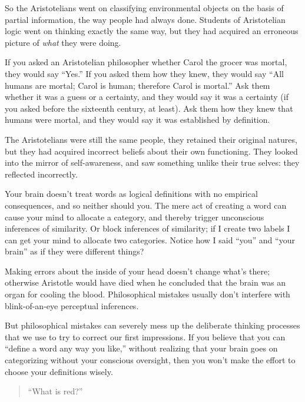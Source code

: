 { So the Aristotelians went on classifying environmental objects on
the basis of partial information, the way people had always done.
Students of Aristotelian logic went on thinking exactly the same way,
but they had acquired an erroneous picture of \textit{what} they were
doing.


 If you asked an Aristotelian philosopher whether Carol the grocer
was mortal, they would say ``Yes.''
If you asked them how they knew, they would say ``All
humans are mortal; Carol is human; therefore Carol is
mortal.'' Ask them whether it was a guess or a
certainty, and they would say it was a certainty (if you asked before
the sixteenth century, at least). Ask them how they knew that humans
were mortal, and they would say it was established by definition.


 The Aristotelians were still the same people, they retained their
original natures, but they had acquired incorrect beliefs about their
own functioning. They looked into the mirror of self-awareness, and saw
something unlike their true selves: they reflected incorrectly.


 Your brain doesn't treat words as logical
definitions with no empirical consequences, and so neither should you.
The mere act of creating a word can cause your mind to allocate a
category, and thereby trigger unconscious inferences of similarity. Or
block inferences of similarity; if I create two labels I can get your
mind to allocate two categories. Notice how I said
``you'' and ``your
brain'' as if they were different things?


 Making errors about the inside of your head
doesn't change what's there; otherwise
Aristotle would have died when he concluded that the brain was an organ
for cooling the blood. Philosophical mistakes usually
don't interfere with blink-of-an-eye perceptual
inferences.


 But philosophical mistakes can severely mess up the deliberate
thinking processes that we use to try to correct our first impressions.
If you believe that you can ``define a word any way
you like,'' without realizing that your brain goes on
categorizing without your conscious oversight, then you
won't make the effort to choose your definitions
wisely.

\myendsectiontext


\begin{quote}

 ``What is red?''



\end{quote}}
